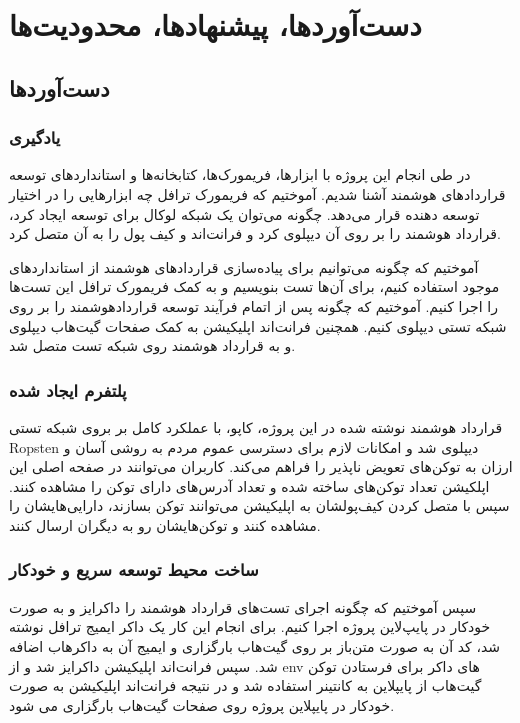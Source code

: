 \chapter{دست‌آوردها، پیشنهاد‌ها، محدودیت‌ها}

\section{دست‌آوردها}

\subsection{یادگیری}
در طی انجام این پروژه با ابزارها، فریمورک‌ها، کتابخانه‌ها و استانداردهای توسعه قراردادهای هوشمند آشنا شدیم. آموختیم که فریمورک ترافل چه ابزارهایی را در اختیار توسعه دهنده قرار می‌دهد. چگونه می‌توان یک شبکه لوکال برای توسعه ایجاد کرد، قرارداد هوشمند را بر روی آن دیپلوی کرد و فرانت‌اند و کیف پول را به آن متصل کرد.

آموختیم که چگونه می‌توانیم برای پیاده‌سازی قراردادهای هوشمند از استانداردهای موجود استفاده کنیم، برای آن‌ها تست بنویسیم و به کمک فریمورک ترافل این تست‌ها را اجرا کنیم. آموختیم که چگونه پس از اتمام فرآیند توسعه قراردادهوشمند را بر روی شبکه تستی دیپلوی کنیم. همچنین فرانت‌اند اپلیکیشن به کمک صفحات گیت‌هاب دیپلوی و به قرارداد هوشمند روی شبکه تست متصل شد.

\subsection{پلتفرم ایجاد شده}
قرارداد هوشمند نوشته شده در این پروژه، کاپو، با عملکرد کامل بر بروی شبکه تستی Ropsten دیپلوی شد و امکانات لازم برای دسترسی عموم مردم به روشی آسان و ارزان به توکن‌های تعویض ناپذیر را فراهم می‌کند. کاربران می‌توانند در صفحه اصلی این اپلکیشن تعداد توکن‌های ساخته شده و تعداد آدرس‌های دارای توکن را مشاهده کنند. سپس با متصل کردن کیف‌پولشان به اپلیکیشن می‌توانند توکن بسازند، دارایی‌هایشان را مشاهده کنند و توکن‌هایشان رو به دیگران ارسال کنند.

\subsection{ساخت محیط توسعه سریع و خودکار}
سپس آموختیم که چگونه اجرای تست‌های قرارداد هوشمند را داکرایز و به صورت خودکار در پایپ‌لاین پروژه اجرا کنیم. برای انجام این کار یک داکر ایمیج ترافل نوشته شد، کد آن به صورت متن‌باز بر روی گیت‌هاب بارگزاری و ایمیج آن به داکرهاب اضافه شد. سپس فرانت‌اند اپلیکیشن داکرایز شد و از env های داکر برای فرستادن توکن گیت‌هاب از پایپلاین به کانتینر استفاده شد و در نتیجه فرانت‌اند اپلیکیشن به صورت خودکار در پایپلاین پروژه روی صفحات گیت‌هاب بارگزاری می شود.

